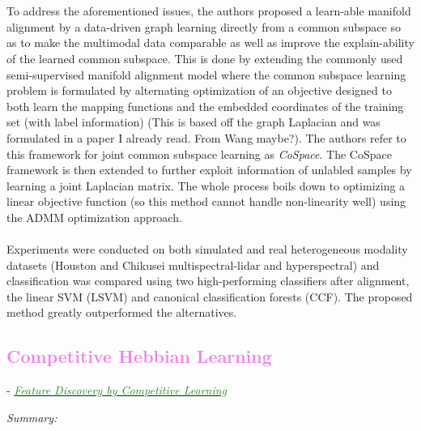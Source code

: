 \documentclass[]{article}
\newcommand{\paperentry}[4]{
            \hangindent=1cm
            \textcolor{red}{\cite{#1}} - \href{run:../References/#3}{\textcolor{ForestGreen}{\textit{#2}}}
            
            \noindent            
            \begin{minipage}[t]{0.1\linewidth}\hfill\end{minipage}
            \begin{minipage}[t]{0.8\linewidth}\textcolor{NavyBlue}{{\textit{Summary:}}}#4\end{minipage}
            \vspace{.25cm}
          }
\begin{document}
		\\ \\
		To address the aforementioned issues, the authors proposed a learn-able manifold alignment by a data-driven graph learning directly from a common subspace so as to make the multimodal data comparable as well as improve the explain-ability of the learned common subspace.  This is done by extending the commonly used semi-supervised manifold alignment model where the common subspace learning problem is formulated by alternating optimization of an objective designed to both learn the mapping functions and the embedded coordinates of the training set (with label information) (This is based off the graph Laplacian and was formulated in a paper I already read.  From Wang maybe?).  The authors refer to this framework for joint common subspace learning as \textit{CoSpace}.  The CoSpace framework is then extended to further exploit information of unlabled samples by learning a joint Laplacian matrix. The whole process boils down to optimizing a linear objective function (so this method cannot handle non-linearity well) using the ADMM optimization approach.
		\\ \\
		Experiments were conducted on both simulated and real heterogeneous modality datasets (Houston and Chikusei multispectral-lidar and hyperspectral) and classification was compared using two high-performing classifiers after alignment, the linear SVM (LSVM) and canonical classification forests (CCF).  The proposed method greatly outperformed the alternatives. \\
		
		
	
	
	\textcolor{Violet}{\subsection{Competitive Hebbian Learning}}
	
	\paperentry
	{Rumelhart1985CHL}
	{Feature Discovery by Competitive Learning}
	{Manifold_Representation_Learning/CHL/Rumelhart1985CHL.pdf}
	{}
	
\end{document}
